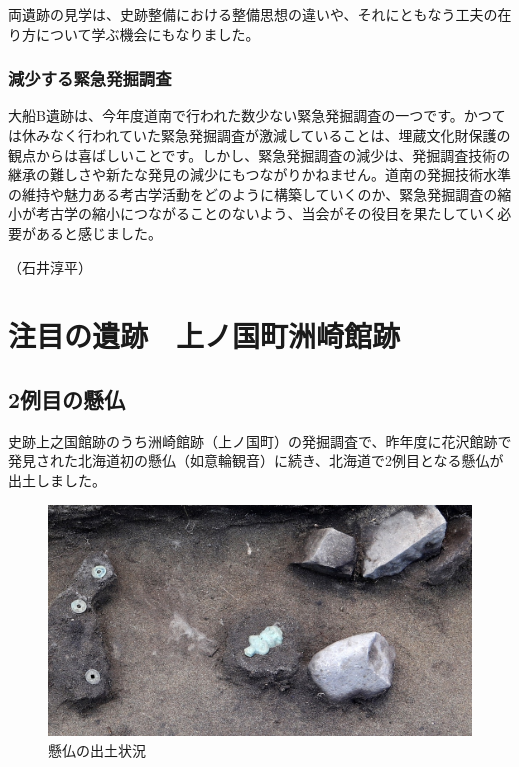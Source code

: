 \documentclass[a4j,11pt,twocolumn,openany]{jsbook}
\begin{document}
両遺跡の見学は、史跡整備における整備思想の違いや、それにともなう工夫の在り方について学ぶ機会にもなりました。

\subsection{減少する緊急発掘調査}
大船B遺跡は、今年度道南で行われた数少ない緊急発掘調査の一つです。かつては休みなく行われていた緊急発掘調査が激減していることは、埋蔵文化財保護の観点からは喜ばしいことです。しかし、緊急発掘調査の減少は、発掘調査技術の継承の難しさや新たな発見の減少にもつながりかねません。道南の発掘技術水準の維持や魅力ある考古学活動をどのように構築していくのか、緊急発掘調査の縮小が考古学の縮小につながることのないよう、当会がその役目を果たしていく必要があると感じました。

\begin{flushright}
	（石井淳平）
\end{flushright}


\chapter{注目の遺跡　上ノ国町洲崎館跡　}

\section{2例目の懸仏}

史跡上之国館跡のうち洲崎館跡（上ノ国町）の発掘調査で、昨年度に花沢館跡で発見された北海道初の懸仏（如意輪観音）に続き、北海道で2例目となる懸仏が出土しました。

\begin{figure}[ht]
	\centering
	\includegraphics[width=\linewidth]{fig/08_Tukada/02shutudo.JPG}
	\caption{懸仏の出土状況}
	\label{}
	\vspace{-\baselineskip}
\end{figure}
\end{document}
